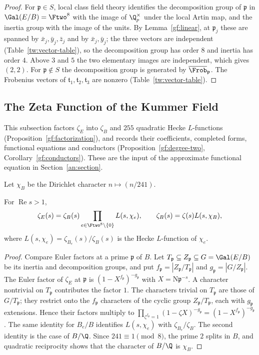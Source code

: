 \begin{proof}
For $\mathfrak p\in S$, local class field theory identifies the
decomposition group of $\mathfrak p$ in $\Gal(E/B)=\Ftwo^8$ with the image
of $\Q_p^\times$ under the local Artin map, and the inertia group with the
image of the units. By Lemma~\ref{gf:linear}, at $\mathfrak p_j$ these are
spanned by $\bar x_j,\bar y_j,\bar z_j$ and by $\bar x_j,\bar y_j$; the three
vectors are independent (Table~\ref{tw:vector-table}), so the decomposition
group has order $8$ and inertia has order $4$. Above $3$ and $5$ the two
elementary images are independent, which gives $(2,2)$. For
$\mathfrak p\notin S$ the decomposition group is generated by
$\overline{\Frob}_{\mathfrak p}$. The Frobenius vectors of $\mathfrak t_1,\mathfrak
t_2,\mathfrak t_3$ are nonzero (Table~\ref{tw:vector-table}).
\end{proof}

\subsection{The Zeta Function of the Kummer Field}\label{gf:zeta-section}
This subsection factors $\zeta_E$ into $\zeta_B$ and $255$ quadratic Hecke
$L$-functions (Proposition~\ref{gf:factorization}), and records their
coefficients, completed forms, functional equations and conductors
(Proposition~\ref{gf:degree-two}, Corollary~\ref{gf:conductors}). These are
the input of the approximate functional equation in
Section~\ref{an:section}.

Let $\chi_B$ be the Dirichlet character $n\mapsto(n/241)$.

\begin{proposition}\label{gf:factorization}
For $\operatorname{Re}s>1$,
\[
 \zeta_E(s)=\zeta_B(s)\prod_{e\in\Ftwo^8\setminus\{0\}}L(s,\chi_e),
 \qquad \zeta_B(s)=\zeta(s)L(s,\chi_B),
\]
where $L(s,\chi_e)=\zeta_{B_e}(s)/\zeta_B(s)$ is the Hecke $L$-function of
$\chi_e$.
\end{proposition}

\begin{proof}
Compare Euler factors at a prime $\mathfrak p$ of $B$. Let $T_{\mathfrak
p}\subseteq Z_{\mathfrak p}\subseteq G=\Gal(E/B)$ be its inertia and
decomposition groups, and put $f_{\mathfrak p}=|Z_{\mathfrak p}/T_{\mathfrak
p}|$ and $g_{\mathfrak p}=|G/Z_{\mathfrak p}|$. The Euler factor of $\zeta_E$
at $\mathfrak p$ is $(1-X^{f_{\mathfrak p}})^{-g_{\mathfrak p}}$ with
$X=\mathrm N\mathfrak p^{-s}$. A character nontrivial on $T_{\mathfrak p}$
contributes the factor $1$. The characters trivial on $T_{\mathfrak p}$ are
those of $G/T_{\mathfrak p}$; they restrict onto the $f_{\mathfrak p}$
characters of the cyclic group $Z_{\mathfrak p}/T_{\mathfrak p}$, each with
$g_{\mathfrak p}$ extensions. Hence their factors multiply to
$\prod_{\zeta^{f_{\mathfrak p}}=1}(1-\zeta X)^{-g_{\mathfrak p}}
=(1-X^{f_{\mathfrak p}})^{-g_{\mathfrak p}}$. The same identity for $B_e/B$
identifies $L(s,\chi_e)$ with $\zeta_{B_e}/\zeta_B$. The second identity is
the case of $B/\Q$. Since $241\equiv1\pmod8$, the prime $2$ splits in $B$,
and quadratic reciprocity shows that the character of $B/\Q$ is
$\chi_B$.
\end{proof}

